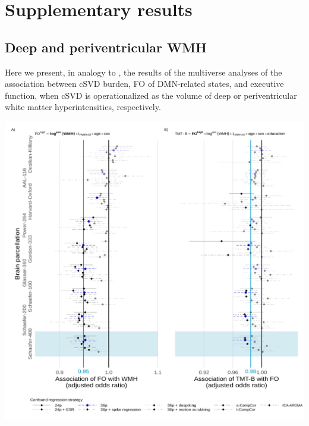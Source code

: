 \section{Supplementary results}
\subsection{Deep and periventricular WMH}
Here we present, in analogy to , the results of the multiverse analyses of the association between cSVD burden, FO of DMN-related states, and executive function, when cSVD is operationalized as the volume of deep or periventricular white matter hyperintensities, respectively.

    \includegraphics[width=\linewidth]{./../analysis/derivatives/Figures/Fig3deep.png}

